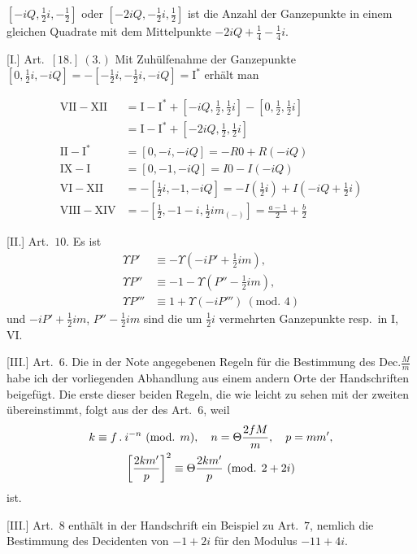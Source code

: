 $[-iQ,\tfrac12i,-\tfrac12]$ oder $[-2iQ,-\tfrac12i,\tfrac12]$ ist die Anzahl der Ganzepunkte in einem gleichen Quadrate mit dem Mittelpunkte $-2iQ+\tfrac14-\tfrac14i$.

[I.] Art.\ $[18.]\ (3.)$ Mit Zuhülfenahme der Ganzepunkte $[0,\tfrac12i,-iQ]=-[-\tfrac12i,-\tfrac12i,-iQ]=\mathrm{I}^{*}$ erhält man

%
\[
\begin{aligned}
\mathrm{VII}-\mathrm{XII}&=\mathrm{I}-\mathrm{I}^{*}+[-iQ,\tfrac12,\tfrac12i]-[0,\tfrac12,\tfrac12i]\\
&=\mathrm{I}-\mathrm{I}^{*}+[-2iQ,\tfrac12,\tfrac12i]\\
\mathrm{II}-\mathrm{I}^{*}&=[0,-i,-iQ]=-R0+R(-iQ)\\
\mathrm{IX}-\mathrm{I}&=[0,-1,-iQ]=I0-I(-iQ)\\
\mathrm{VI}-\mathrm{XII}&=-[\tfrac12i,-1,-iQ]=-I(\tfrac12i)+I(-iQ+\tfrac12i)\\
\mathrm{VIII}-\mathrm{XIV}&=-[\tfrac12,-1-i,\tfrac12im_{(-)}]=\frac{a-1}{2}+\frac b2
\end{aligned}
\]

[II.] Art.\ $10$. Es ist
\[
\begin{aligned}
\Upsilon P'&\equiv-\Upsilon(-iP'+\tfrac12im),\\
\Upsilon P''&\equiv-1-\Upsilon(P''-\tfrac12im),\\
\Upsilon P'''&\equiv1+\Upsilon(-iP''')\ (\text{mod. }4)
\end{aligned}
\]
und $-iP'+\tfrac12im$, $P''-\tfrac12im$ sind die um $\tfrac12i$ vermehrten Ganzepunkte resp.\ in I, VI.

[III.] Art.\ $6$. Die in der Note angegebenen Regeln für die Bestimmung des $\mathrm{Dec.}\frac Mm$ habe ich der vorliegenden Abhandlung aus einem andern Orte der Handschriften beigefügt. Die erste dieser beiden Regeln, die wie leicht zu sehen mit der zweiten übereinstimmt, folgt aus der des Art.\ $6$, weil
\[
\begin{gathered}
k\equiv f\mathbin{.} i^{-n}\ (\text{mod. }m),\quad n=\Theta\frac{2fM}{m},\quad p=mm',\\
\left[\frac{2km'}p\right]^2\equiv\Theta\frac{2km'}p\ (\text{mod. }2+2i)
\end{gathered}
\]
ist.

[III.] Art.\ $8$ enthält in der Handschrift ein Beispiel zu Art.\ $7$, nemlich die Bestimmung des Decidenten von $-1+2i$ für den Modulus $-11+4i$.

